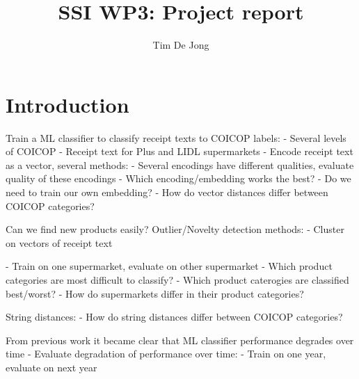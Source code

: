 \documentclass{article}
\title{SSI WP3: Project report}
\author{Tim De Jong}
\begin{document}
\maketitle


\section{Introduction}

Train a ML classifier to classify receipt texts to COICOP labels:
- Several levels of COICOP
- Receipt text for Plus and LIDL supermarkets
- Encode receipt text as a vector, several methods: 
    - Several encodings have different qualities, evaluate quality of these encodings
    - Which encoding/embedding works the best?
    - Do we need to train our own embedding?
    - How do vector distances differ between COICOP categories?
    
Can we find new products easily? Outlier/Novelty detection methods:    
    - Cluster on vectors of receipt text

- Train on one supermarket, evaluate on other supermarket
- Which product categories are most difficult to classify?
- Which product caterogies are classified best/worst?
- How do supermarkets differ in their product categories?

String distances:
- How do string distances differ between COICOP categories?

From previous work it became clear that ML classifier performance degrades over time
- Evaluate degradation of performance over time:
    - Train on one year, evaluate on next year
\end{document}
